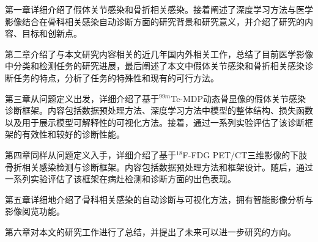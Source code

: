 第一章详细介绍了假体关节感染和骨折相关感染。接着阐述了深度学习方法与医学影像结合在骨科相关感染自动诊断方面的研究背景和研究意义，并介绍了研究的内容、目标和创新点。

第二章介绍了与本文研究内容相关的近几年国内外相关工作，总结了目前医学影像中分类和检测任务的研究进展，最后阐述了本文中假体关节感染和骨折相关感染诊断任务的特点，分析了任务的特殊性和现有的可行方法。

第三章从问题定义出发，详细介绍了基于\(^{99m}\)Tc-MDP动态骨显像的假体关节感染诊断框架。内容包括数据预处理方法、深度学习方法中模型的整体结构、损失函数以及用于展示模型可解释性的可视化方法。接着，通过一系列实验评估了该诊断框架的有效性和较好的诊断性能。

第四章同样从问题定义入手，详细介绍了基于\(^{18}\)F-FDG PET/CT三维影像的下肢骨折相关感染检测与诊断框架。内容包括数据预处理方法和框架设计。随后，通过一系列实验评估了该框架在病灶检测和诊断方面的出色表现。

第五章详细地介绍了骨科相关感染的自动诊断与可视化方法，拥有智能影像分析与影像阅览功能。

第六章对本文的研究工作进行了总结，并提出了未来可以进一步研究的方向。











